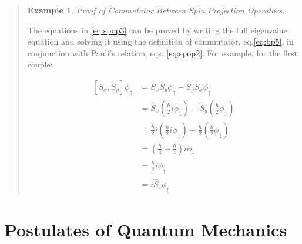 \documentclass[
  9pt,
]{extbook}
\theoremstyle{definition}
\theoremstyle{definition}
\newtheorem{example}{Example}[chapter]
\theoremstyle{definition}
\theoremstyle{remark}
\begin{document}
\begin{quote}
\begin{example}
\protect\hypertarget{exm:spinex1}{}{\label{exm:spinex1} }\emph{Proof of Commutator Between Spin Projection Operators.}

The equations in \eqref{eq:spop3} can be proved by writing the full eigenvalue equation and solving it using the definition of commutator, eq.\eqref{eq:bp5}, in conjunction with Pauli's relation, eqs. \eqref{eq:spop2}. For example, for the first couple:

\begin{equation}
\begin{aligned}
\left[\hat{S}_x, \hat{S}_y\right] \phi_{\uparrow} &= \hat{S}_x\hat{S}_y\phi_{\uparrow}-\hat{S}_y\hat{S}_x\phi_{\uparrow} \\
&= \hat{S}_x \left(\frac{\hbar}{2}i \phi_{\downarrow} \right)-\hat{S}_y \left(\frac{\hbar}{2} \phi_{\downarrow} \right) \\
&= \frac{\hbar}{2}i \left(\frac{\hbar}{2}i \phi_{\downarrow} \right)- \frac{\hbar}{2} \left(\frac{\hbar}{2} \phi_{\downarrow} \right) \\
&= \left(\frac{\hbar}{4}+\frac{\hbar}{4}\right)i\phi_{\uparrow} \\
&= \frac{\hbar}{2}i \phi_{\uparrow} \\
&= i\hat{S}_z  \phi_{\uparrow} 
\end{aligned}
\label{eq:spop4} 
\end{equation}
\end{example}
\end{quote}

\hypertarget{Postulates}{%
\chapter{Postulates of Quantum Mechanics}\label{Postulates}}
\end{document}
